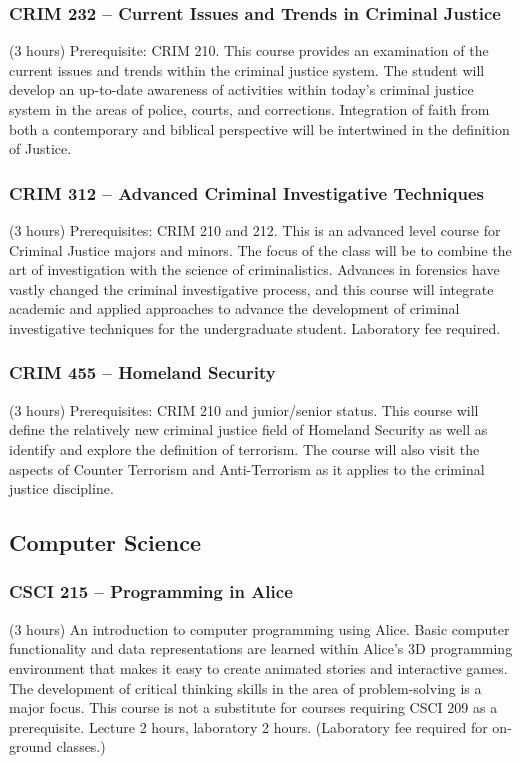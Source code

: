 \subsubsection{CRIM 232 -- Current Issues and Trends in Criminal Justice}
(3 hours) Prerequisite: CRIM 210. This course provides an examination of the current issues and trends within the criminal justice system. The student will develop an up-to-date awareness of activities within today’s criminal justice system in the areas of police, courts, and corrections. Integration of faith from both a contemporary and biblical perspective will be intertwined in the definition of Justice.

\subsubsection{CRIM 312 -- Advanced Criminal Investigative Techniques}
(3 hours) Prerequisites: CRIM 210 and 212. This is an advanced level course for Criminal Justice majors and minors. The focus of the class will be to combine the art of investigation with the science of criminalistics.  Advances in forensics have vastly changed the criminal investigative process, and this course will integrate academic and applied approaches to advance the development of criminal investigative techniques for the undergraduate student. Laboratory fee required.

\subsubsection{CRIM 455 -- Homeland Security}
(3 hours) Prerequisites: CRIM 210 and junior/senior status. This course will define the relatively new criminal justice field of Homeland Security as well as identify and explore the definition of terrorism. The course will also visit the aspects of Counter Terrorism and Anti-Terrorism as it applies to the criminal justice discipline.


\subsection{Computer Science}

\subsubsection{CSCI 215 -- Programming in Alice}
(3 hours) An introduction to computer programming using Alice. Basic computer functionality and data representations are learned within Alice’s 3D programming environment that makes it easy to create animated stories and interactive games. The development of critical thinking skills in the area of problem-solving is a major focus. This course is not a substitute for courses requiring CSCI 209 as a prerequisite. Lecture 2 hours, laboratory 2 hours. (Laboratory fee required for on-ground classes.)

